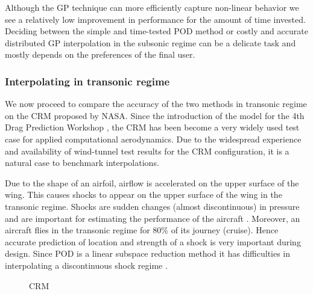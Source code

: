 Although the GP technique can more efficiently capture non-linear behavior we see a relatively low improvement in performance for the amount of time invested. Deciding between the simple and time-tested POD method or costly and accurate distributed GP interpolation in the subsonic regime can be a delicate task and mostly depends on the preferences of the final user.

\subsubsection{Interpolating in transonic regime}\label{subSec:resultsCRM}
We now proceed to compare the accuracy of the two methods in transonic regime on the CRM proposed by NASA. Since the introduction of the model for the 4th Drag Prediction Workshop \cite{vassberg2014summary}, the CRM has been become a very widely used test case for applied computational aerodynamics. Due to the widespread experience and availability of wind-tunnel test results for the CRM configuration, it is a natural case to benchmark interpolations. 

Due to the shape of an airfoil, airflow is accelerated on the upper surface of the wing. This causes shocks to appear on the upper surface of the wing in the transonic regime. Shocks are sudden changes (almost discontinuous) in pressure and are important for estimating the performance of the aircraft \cite{jameson1974iterative, cole2012transonic}. Moreover, an aircraft flies in the transonic regime for 80\% of its journey (cruise). Hence accurate prediction of location and strength of a shock is very important during design. Since POD is a linear subspace reduction method it has difficulties in interpolating a discontinuous shock regime \cite{verveld2016reduced}.

\begin{figure}[!ht]
  \centering
  \quad
  \caption{CRM}
\end{figure}

